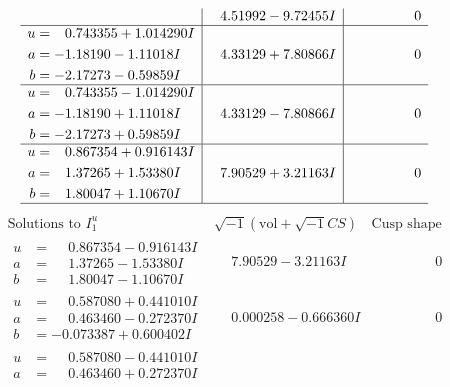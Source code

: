 \documentclass[1p]{elsarticle_modified}
\theoremstyle{definition}
\newcommand{\I}{\sqrt{-1}}
\begin{document}
$$\begin{array}{c|c|c}
 & \phantom{-}4.51992 - 9.72455 I & \phantom{-0.000000 } 0 \\ \hline\begin{aligned}
u &= \phantom{-}0.743355 + 1.014290 I \\
a &= -1.18190 - 1.11018 I \\
b &= -2.17273 - 0.59859 I\end{aligned}
 & \phantom{-}4.33129 + 7.80866 I & \phantom{-0.000000 } 0 \\ \hline\begin{aligned}
u &= \phantom{-}0.743355 - 1.014290 I \\
a &= -1.18190 + 1.11018 I \\
b &= -2.17273 + 0.59859 I\end{aligned}
 & \phantom{-}4.33129 - 7.80866 I & \phantom{-0.000000 } 0 \\ \hline\begin{aligned}
u &= \phantom{-}0.867354 + 0.916143 I \\
a &= \phantom{-}1.37265 + 1.53380 I \\
b &= \phantom{-}1.80047 + 1.10670 I\end{aligned}
 & \phantom{-}7.90529 + 3.21163 I & \phantom{-0.000000 } 0\\
 \hline 
 \end{array}$$\newpage$$\begin{array}{c|c|c}  
\text{Solutions to }I^u_{1}& \I (\text{vol} + \sqrt{-1}CS) & \text{Cusp shape}\\
 \hline 
\begin{aligned}
u &= \phantom{-}0.867354 - 0.916143 I \\
a &= \phantom{-}1.37265 - 1.53380 I \\
b &= \phantom{-}1.80047 - 1.10670 I\end{aligned}
 & \phantom{-}7.90529 - 3.21163 I & \phantom{-0.000000 } 0 \\ \hline\begin{aligned}
u &= \phantom{-}0.587080 + 0.441010 I \\
a &= \phantom{-}0.463460 - 0.272370 I \\
b &= -0.073387 + 0.600402 I\end{aligned}
 & \phantom{-}0.000258 - 0.666360 I & \phantom{-0.000000 } 0 \\ \hline\begin{aligned}
u &= \phantom{-}0.587080 - 0.441010 I \\
a &= \phantom{-}0.463460 + 0.272370 I \\

\end{aligned}
\end{array}$$
\end{document}

